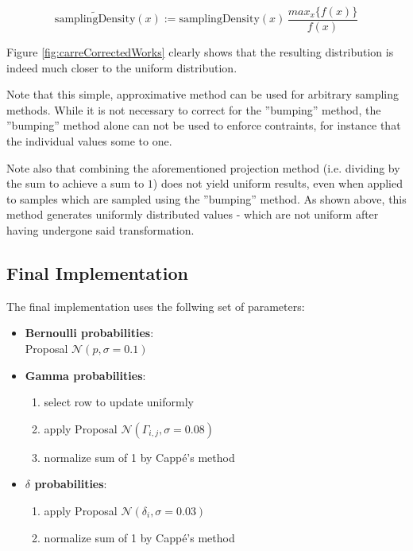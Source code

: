 \[
\tilde{\text{samplingDensity}}(x) := \text{samplingDensity}(x) \, \frac{max_x\{ f(x) \}}{f(x)}
\]

Figure \ref{fig:carreCorrectedWorks} clearly shows that the resulting distribution is indeed much closer to the uniform distribution. 


Note that this simple, approximative method can be used for arbitrary sampling methods. While it is not necessary to correct for the ''bumping'' method, the ''bumping'' method alone can not be used to enforce contraints, for instance that the individual values some to one. 

Note also that combining the aforementioned projection method (i.e. dividing by the sum to achieve a sum to $1$) does not yield uniform results, even when applied to samples which are sampled using the ''bumping'' method. As shown above, this method generates uniformly distributed values - which are not uniform after having undergone said transformation. 



\subsection{Final Implementation}

The final implementation uses the follwing set of parameters:
\begin{itemize}
	\item \textbf{Bernoulli probabilities}:\\
		Proposal $\mathcal{N}\left( p, \sigma = 0.1 \right)$
	\item \textbf{Gamma probabilities}:
		\begin{enumerate}
			\item select row to update uniformly
			\item apply Proposal $\mathcal{N}\left( \Gamma_{i,j}, \sigma = 0.08 \right)$
			\item normalize sum of 1 by Cappé's method
		\end{enumerate}
	\item \textbf{$\delta$ probabilities}:
		\begin{enumerate}
			\item apply Proposal $\mathcal{N}\left( \delta_i, \sigma = 0.03 \right)$
			\item normalize sum of 1 by Cappé's method
		\end{enumerate}
\end{itemize}

